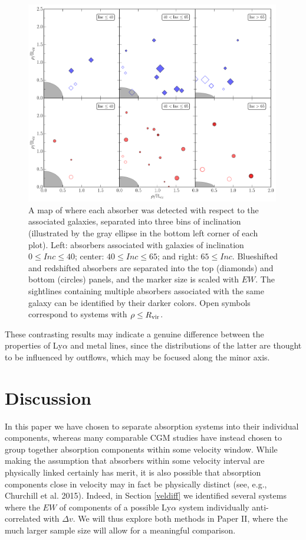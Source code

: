 \begin{figure}[ht!]
        \centering
        \includegraphics[width=0.99\textwidth]{Chap3/figures/fig13.pdf}
        \caption{\small{A map of where each absorber was detected with respect to the associated galaxies, separated into three bins of inclination (illustrated by the gray ellipse in the bottom left corner of each plot). Left: absorbers associated with galaxies of inclination $0 \leq Inc \le 40$; center: $40 \leq Inc \le 65$; and right: $65 \leq Inc$. Blueshifted and redshifted absorbers are separated into the top (diamonds) and bottom (circles) panels, and the marker size is scaled with $EW$. The sightlines containing multiple absorbers associated with the same galaxy can be identified by their darker colors. Open symbols correspond to systems with $\rho \leq R_{\rm vir}$.}}
        \label{azimuthMap}
\end{figure} 

These contrasting results may indicate a genuine difference between the properties of Ly$\alpha$ and metal lines, since the distributions of the latter are thought to be influenced by outflows, which may be focused along the minor axis.


\section{Discussion}


In this paper we have chosen to separate absorption systems into their individual components, whereas many comparable CGM studies have instead chosen to group together absorption components within some velocity window. While making the assumption that absorbers within some velocity interval are physically linked certainly has merit, it is also possible that absorption components close in velocity may in fact be physically distinct (see, e.g., Churchill et al. 2015). Indeed, in Section \ref{veldiff} we identified several systems where the $EW$ of components of a possible Ly$\alpha$ system individually anti-correlated with $\Delta v$. We will thus explore both methods in Paper II, where the much larger sample size will allow for a meaningful comparison.\\

